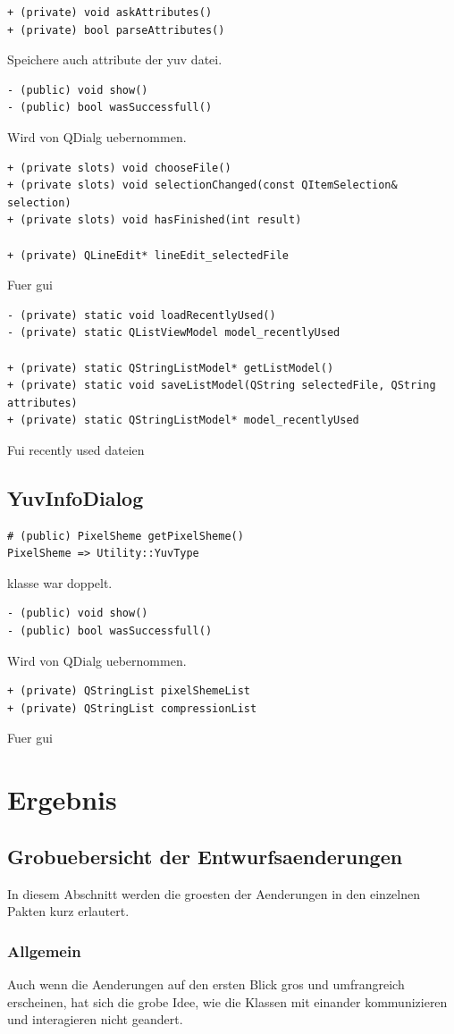 \documentclass{scrartcl}
\begin{document}
{\begin{verbatim}
+ (private) void askAttributes()
+ (private) bool parseAttributes()
\end{verbatim}
Speichere auch attribute der yuv datei.
\begin{verbatim}
- (public) void show()
- (public) bool wasSuccessfull()
\end{verbatim}
Wird von QDialg uebernommen.
\begin{verbatim}
+ (private slots) void chooseFile()
+ (private slots) void selectionChanged(const QItemSelection& selection)
+ (private slots) void hasFinished(int result)

+ (private) QLineEdit* lineEdit_selectedFile
\end{verbatim}
Fuer gui
\begin{verbatim}
- (private) static void loadRecentlyUsed()
- (private) static QListViewModel model_recentlyUsed

+ (private) static QStringListModel* getListModel()
+ (private) static void saveListModel(QString selectedFile, QString attributes)
+ (private) static QStringListModel* model_recentlyUsed
\end{verbatim}
Fui recently used dateien
\subsection{YuvInfoDialog}
\begin{verbatim}
# (public) PixelSheme getPixelSheme()
PixelSheme => Utility::YuvType
\end{verbatim}
klasse war doppelt.
\begin{verbatim}
- (public) void show()
- (public) bool wasSuccessfull()
\end{verbatim}
Wird von QDialg uebernommen.
\begin{verbatim}
+ (private) QStringList pixelShemeList
+ (private) QStringList compressionList
\end{verbatim}
Fuer gui
\section{Ergebnis}
\subsection{Grobuebersicht der Entwurfsaenderungen}
In diesem Abschnitt werden die groesten der Aenderungen in den einzelnen Pakten kurz erlautert.
\subsubsection{Allgemein}
Auch wenn die Aenderungen auf den ersten Blick gros und umfrangreich erscheinen, hat sich die grobe Idee, wie die Klassen mit einander kommunizieren und interagieren nicht geandert.
}
\end{document}
